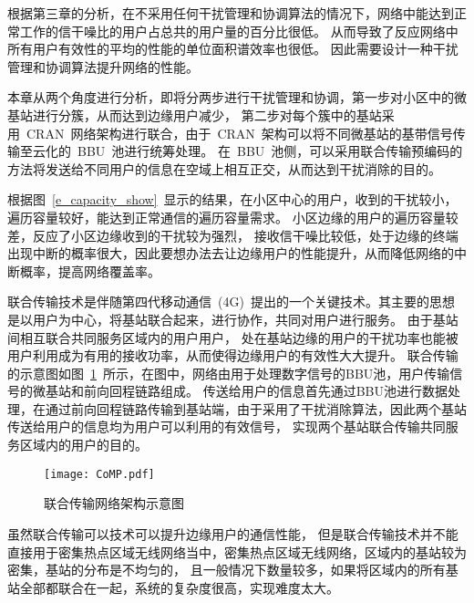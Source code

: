 

根据第三章的分析，在不采用任何干扰管理和协调算法的情况下，网络中能达到正常工作的信干噪比的用户占总共的用户量的百分比很低。
从而导致了反应网络中所有用户有效性的平均的性能的单位面积谱效率也很低。
因此需要设计一种干扰管理和协调算法提升网络的性能。

本章从两个角度进行分析，即将分两步进行干扰管理和协调，第一步对小区中的微基站进行分簇，从而达到边缘用户减少，
第二步对每个簇中的基站采用~CRAN~网络架构进行联合，由于~CRAN~架构可以将不同微基站的基带信号传输至云化的~BBU~池进行统筹处理。
在~BBU~池侧，可以采用联合传输预编码的方法将发送给不同用户的信息在空域上相互正交，从而达到干扰消除的目的。

根据图~\ref{e_capacity_show}~显示的结果，在小区中心的用户，收到的干扰较小，遍历容量较好，能达到正常通信的遍历容量需求。
小区边缘的用户的遍历容量较差，反应了小区边缘收到的干扰较为强烈，
接收信干噪比较低，处于边缘的终端出现中断的概率很大，因此要想办法去让边缘用户的性能提升，从而降低网络的中断概率，提高网络覆盖率。

联合传输技术是伴随第四代移动通信~(4G)~提出的一个关键技术。其主要的思想是以用户为中心，将基站联合起来，进行协作，共同对用户进行服务。
由于基站间相互联合共同服务区域内的用户用户，
处在基站边缘的用户的干扰功率也能被用户利用成为有用的接收功率，从而使得边缘用户的有效性大大提升。
联合传输的示意图如图~\ref{CoMP}~所示，在图中，网络由用于处理数字信号的BBU池，用户传输信号的微基站和前向回程链路组成。
传送给用户的信息首先通过BBU池进行数据处理，在通过前向回程链路传输到基站端，由于采用了干扰消除算法，因此两个基站传送给用户的信息均为用户可以利用的有效信号，
实现两个基站联合传输共同服务区域内的用户的目的。
\begin{figure}[htbp]
\centering
\texttt{[image: CoMP.pdf]}
\caption{联合传输网络架构示意图}\vspace{-0.5em}
\label{CoMP}
\end{figure}

虽然联合传输可以技术可以提升边缘用户的通信性能，
但是联合传输技术并不能直接用于密集热点区域无线网络当中，密集热点区域无线网络，区域内的基站较为密集，基站的分布是不均匀的，
且一般情况下数量较多，如果将区域内的所有基站全部都联合在一起，系统的复杂度很高，实现难度太大。


